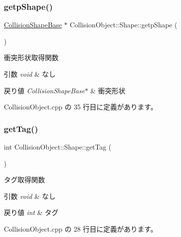 \subsubsection{\texorpdfstring{getp\+Shape()}{getpShape()}}
{\footnotesize\ttfamily \mbox{\hyperlink{class_collision_shape_base}{Collision\+Shape\+Base}} $\ast$ Collision\+Object\+::\+Shape\+::getp\+Shape (\begin{DoxyParamCaption}{ }\end{DoxyParamCaption})}



衝突形状取得関数 


\begin{DoxyParams}{引数}
{\em void} & なし \\
\hline
\end{DoxyParams}

\begin{DoxyRetVals}{戻り値}
{\em Collision\+Shape\+Base$\ast$} & 衝突形状 \\
\hline
\end{DoxyRetVals}


 Collision\+Object.\+cpp の 35 行目に定義があります。

\mbox{\label{class_collision_object_1_1_shape_a6a667cdd25268a81aeff777dec82884c}} 
\subsubsection{\texorpdfstring{get\+Tag()}{getTag()}}
{\footnotesize\ttfamily int Collision\+Object\+::\+Shape\+::get\+Tag (\begin{DoxyParamCaption}{ }\end{DoxyParamCaption})}



タグ取得関数 


\begin{DoxyParams}{引数}
{\em void} & なし \\
\hline
\end{DoxyParams}

\begin{DoxyRetVals}{戻り値}
{\em int} & タグ \\
\hline
\end{DoxyRetVals}


 Collision\+Object.\+cpp の 28 行目に定義があります。

